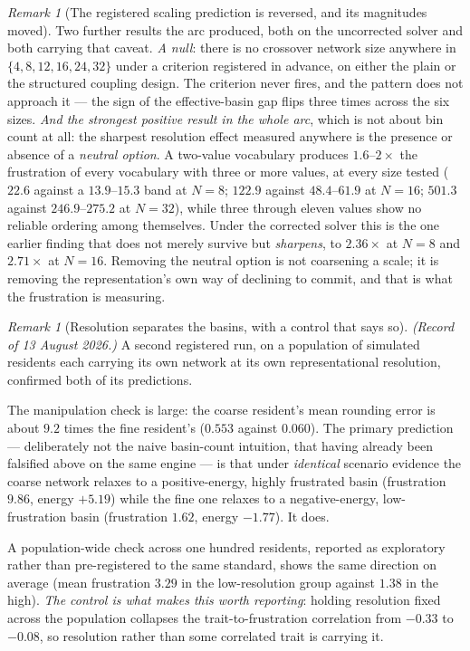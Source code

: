 \documentclass[11pt,a4paper]{article}
\theoremstyle{remark}
\newtheorem{remark}[definition]{Remark}
\begin{document}
\begin{remark}[The registered scaling prediction is reversed, and its magnitudes moved]
Two further results the arc produced, both on the uncorrected solver and both carrying that caveat.
\emph{A null}: there is no crossover network size anywhere in $\{4,8,12,16,24,32\}$ under a criterion
registered in advance, on either the plain or the structured coupling design. The criterion never
fires, and the pattern does not approach it --- the sign of the effective-basin gap flips three times
across the six sizes. \emph{And the strongest positive result in the whole arc}, which is not about
bin count at all: the sharpest resolution effect measured anywhere is the presence or absence of a
\emph{neutral option}. A two-value vocabulary produces $1.6$--$2\times$ the frustration of every
vocabulary with three or more values, at every size tested ($22.6$ against a $13.9$--$15.3$ band at
$N=8$; $122.9$ against $48.4$--$61.9$ at $N=16$; $501.3$ against $246.9$--$275.2$ at $N=32$), while
three through eleven values show no reliable ordering among themselves. Under the corrected solver
this is the one earlier finding that does not merely survive but \emph{sharpens}, to $2.36\times$ at
$N=8$ and $2.71\times$ at $N=16$. Removing the neutral option is not coarsening a scale; it is removing
the representation's own way of declining to commit, and that is what the frustration is measuring.
\end{remark}

\begin{remark}[Resolution separates the basins, with a control that says so]\label{rem:bigville}
\emph{(Record of 13 August 2026.)} A second registered run, on a population of simulated residents each
carrying its own network at its own representational resolution, confirmed both of its predictions.

The manipulation check is large: the coarse resident's mean rounding error is about $9.2$ times the
fine resident's ($0.553$ against $0.060$). The primary prediction --- deliberately not the naive
basin-count intuition, that having already been falsified above on the same engine --- is that under
\emph{identical} scenario evidence the coarse network relaxes to a positive-energy, highly frustrated
basin (frustration $9.86$, energy $+5.19$) while the fine one relaxes to a negative-energy,
low-frustration basin (frustration $1.62$, energy $-1.77$). It does.

A population-wide check across one hundred residents, reported as exploratory rather than
pre-registered to the same standard, shows the same direction on average (mean frustration $3.29$ in
the low-resolution group against $1.38$ in the high). \emph{The control is what makes this worth
reporting}: holding resolution fixed across the population collapses the trait-to-frustration
correlation from $-0.33$ to $-0.08$, so resolution rather than some correlated trait is carrying it.
\end{remark}
\end{document}
